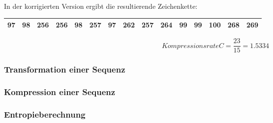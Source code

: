 \documentclass[12pt,german]{article}
\begin{document}
In der korrigierten Version ergibt die resultierende Zeichenkette: 

\begin{table}[H]
  \centering
  \begin{tabular}{| c | c | c | c | c | c | c | c | c | c | c | c | c | c | c |}
    \hline
    97 & 98& 256 & 256 & 98 & 257 & 97 & 262 & 257 & 264 & 99 & 99 & 100 & 268 & 269 \\
    \hline
  \end{tabular}
\end{table}


\begin{equation}[H]
 Kompressionsrate C = \frac{23}{15} = 1.5334	
\end{equation}


\subsubsection{Transformation einer Sequenz}

\subsubsection{Kompression einer Sequenz}

\subsubsection{Entropieberechnung}
\end{document}
